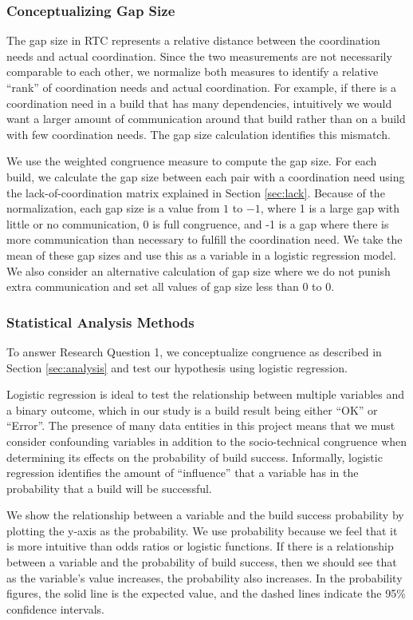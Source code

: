\subsubsection{Conceptualizing Gap Size}
The gap size in RTC represents a relative distance between the coordination needs and actual coordination. Since the two measurements are not necessarily comparable to each other, we normalize both measures to identify a relative ``rank'' of coordination needs and actual coordination. For example, if there is a coordination need in a build that has many dependencies, intuitively we would want a larger amount of communication around that build rather than on a build with few coordination needs. The gap size calculation identifies this mismatch.

We use the weighted congruence measure to compute the gap size. For each build, we calculate the gap size between each pair with a coordination need using the lack-of-coordination matrix explained in Section \ref{sec:lack}. Because of the normalization, each gap size is a value from $1$ to $-1$, where 1 is a large gap with little or no communication, 0 is full congruence, and -1 is a gap where there is more communication than necessary to fulfill the coordination need. We take the mean of these gap sizes and use this as a variable in a logistic regression model. We also consider an alternative calculation of gap size where we do not punish extra communication and set all values of gap size less than 0 to 0.

\subsubsection{Statistical Analysis Methods}
To answer Research Question 1, we conceptualize congruence as described in Section \ref{sec:analysis} and test our hypothesis using logistic regression.

Logistic regression is ideal to test the relationship between multiple variables and a binary outcome, which in our study is a build result being either ``OK'' or ``Error''. The presence of many data entities in this project means that we must consider confounding variables in addition to the socio-technical congruence when determining its effects on the probability of build success. Informally, logistic regression identifies the amount of ``influence'' that a variable has in the probability that a build will be successful.

We show the relationship between a variable and the build success probability by plotting the y-axis as the probability. We use probability because we feel that it is more intuitive than odds ratios or logistic functions. If there is a relationship between a variable and the probability of build success, then we should see that as the variable's value increases, the probability also increases. In the probability figures, the solid line is the expected value, and the dashed lines indicate the 95\% confidence intervals.

